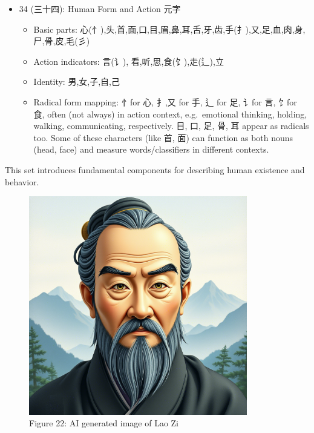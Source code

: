 \documentclass[
  11pt,
  letterpaper,
]{article}
\providecommand{\tightlist}{%
  \setlength{\itemsep}{0pt}\setlength{\parskip}{0pt}}
\begin{document}
\begin{itemize}
\tightlist
\item
  34 (三十四): Human Form and Action 元字

  \begin{itemize}
  \tightlist
  \item
    Basic parts:
    心(忄),头,首,面,口,目,眉,鼻,耳,舌,牙,齿,手(扌),又,足,血,肉,身,尸,骨,皮,毛(彡)
  \item
    Action indicators: 言(讠), 看,听,思,食(饣),走(辶),立
  \item
    Identity: 男,女,子,自,己
  \item
    Radical form mapping: 忄for 心, 扌,又 for 手, 辶 for 足, 讠for 言,
    饣for 食, often (not always) in action context, e.g.~emotional
    thinking, holding, walking, communicating, respectively. 目, 口, 足,
    骨, 耳 appear as radicals too. Some of these characters (like 首,
    面) can function as both nouns (head, face) and measure
    words/classifiers in different contexts.
  \end{itemize}
\end{itemize}

This set introduces fundamental components for describing human
existence and behavior.

\begin{figure}
\centering
\includegraphics[width=0.85\textwidth]{./images/laozi-qwen-max.png}
\caption{Figure 22: AI generated image of Lao Zi}
\end{figure}
\end{document}
